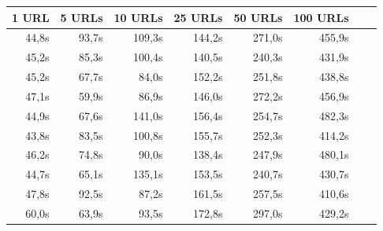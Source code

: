 \documentclass{scrartcl}
\begin{document}
\begin{table}[h]
\center
\begin{tabular}{@{}llllllll@{}}
\toprule
1 URL       & 5 URLs      & 10 URLs      & 25 URLs      & 50 URLs      & 100 URLs     \\ \midrule
\multicolumn{1}{r}{44,8s}       & \multicolumn{1}{r}{93,7s}       & \multicolumn{1}{r}{109,3s}       & \multicolumn{1}{r}{144,2s}       & \multicolumn{1}{r}{271,0s}       & \multicolumn{1}{r}{455,9s}        \\
\multicolumn{1}{r}{45,2s}       & \multicolumn{1}{r}{85,3s}       & \multicolumn{1}{r}{100,4s}       & \multicolumn{1}{r}{140,5s}       & \multicolumn{1}{r}{240,3s}       & \multicolumn{1}{r}{431,9s}        \\
\multicolumn{1}{r}{45,2s}       & \multicolumn{1}{r}{67,7s}       & \multicolumn{1}{r}{84,0s}        & \multicolumn{1}{r}{152,2s}       & \multicolumn{1}{r}{251,8s}       & \multicolumn{1}{r}{438,8s}        \\
\multicolumn{1}{r}{47,1s}       & \multicolumn{1}{r}{59,9s}       & \multicolumn{1}{r}{86,9s}        & \multicolumn{1}{r}{146,0s}       & \multicolumn{1}{r}{272,2s}       & \multicolumn{1}{r}{456,9s}        \\
\multicolumn{1}{r}{44,9s}       & \multicolumn{1}{r}{67,6s}       & \multicolumn{1}{r}{141,0s}       & \multicolumn{1}{r}{156,4s}       & \multicolumn{1}{r}{254,7s}       & \multicolumn{1}{r}{482,3s}        \\
\multicolumn{1}{r}{43,8s}       & \multicolumn{1}{r}{83,5s}       & \multicolumn{1}{r}{100,8s}       & \multicolumn{1}{r}{155,7s}       & \multicolumn{1}{r}{252,3s}       & \multicolumn{1}{r}{414,2s}        \\
\multicolumn{1}{r}{46,2s}       & \multicolumn{1}{r}{74,8s}       & \multicolumn{1}{r}{90,0s}        & \multicolumn{1}{r}{138,4s}       & \multicolumn{1}{r}{247,9s}       & \multicolumn{1}{r}{480,1s}        \\
\multicolumn{1}{r}{44,7s}       & \multicolumn{1}{r}{65,1s}       & \multicolumn{1}{r}{135,1s}       & \multicolumn{1}{r}{153,5s}       & \multicolumn{1}{r}{240,7s}       & \multicolumn{1}{r}{430,7s}        \\
\multicolumn{1}{r}{47,8s}       & \multicolumn{1}{r}{92,5s}       & \multicolumn{1}{r}{87,2s}        & \multicolumn{1}{r}{161,5s}       & \multicolumn{1}{r}{257,5s}       & \multicolumn{1}{r}{410,6s}        \\
\multicolumn{1}{r}{60,0s}       & \multicolumn{1}{r}{63,9s}       & \multicolumn{1}{r}{93,5s}        & \multicolumn{1}{r}{172,8s}       & \multicolumn{1}{r}{297,0s}       & \multicolumn{1}{r}{429,2s}        \\

\end{tabular}
\end{table}
\end{document}
